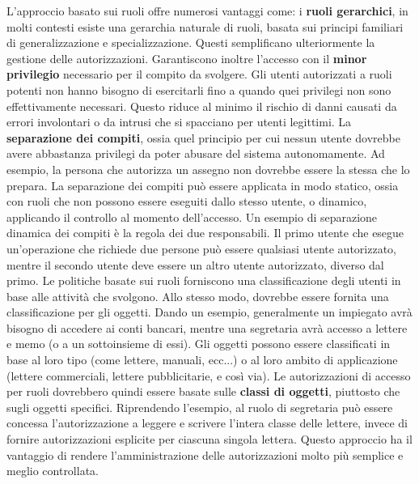                 L'approccio basato sui ruoli offre numerosi vantaggi come: i \textbf{ruoli gerarchici}, in molti contesti esiste una gerarchia naturale di ruoli, basata sui principi familiari di generalizzazione e specializzazione. Questi semplificano ulteriormente la gestione delle autorizzazioni. Garantiscono inoltre l'accesso con il \textbf{minor privilegio} necessario per il compito da svolgere. Gli utenti autorizzati a ruoli potenti non hanno bisogno di esercitarli fino a quando quei privilegi non sono effettivamente necessari. Questo riduce al minimo il rischio di danni causati da errori involontari o da intrusi che si spacciano per utenti legittimi. La \textbf{separazione dei compiti}, ossia quel principio per cui nessun utente dovrebbe avere abbastanza privilegi da poter abusare del sistema autonomamente. Ad esempio, la persona che autorizza un assegno non dovrebbe essere la stessa che lo prepara. La separazione dei compiti può essere applicata in modo statico, ossia con ruoli che non possono essere eseguiti dallo stesso utente, o dinamico, applicando il controllo al momento dell'accesso. Un esempio di separazione dinamica dei compiti è la regola dei due responsabili. Il primo utente che esegue un'operazione che richiede due persone può essere qualsiasi utente autorizzato, mentre il secondo utente deve essere un altro utente autorizzato, diverso dal primo. Le politiche basate sui ruoli forniscono una classificazione degli utenti in base alle attività che svolgono. Allo stesso modo, dovrebbe essere fornita una classificazione per gli oggetti. Dando un esempio, generalmente un impiegato avrà bisogno di accedere ai conti bancari, mentre una segretaria avrà accesso a lettere e memo (o a un sottoinsieme di essi). Gli oggetti possono essere classificati in base al loro tipo (come lettere, manuali, ecc...) o al loro ambito di applicazione (lettere commerciali, lettere pubblicitarie, e così via). Le autorizzazioni di accesso per ruoli dovrebbero quindi essere basate sulle \textbf{classi di oggetti}, piuttosto che sugli oggetti specifici. Riprendendo l'esempio, al ruolo di segretaria può essere concessa l'autorizzazione a leggere e scrivere l'intera classe delle lettere, invece di fornire autorizzazioni esplicite per ciascuna singola lettera. Questo approccio ha il vantaggio di rendere l'amministrazione delle autorizzazioni molto più semplice e meglio controllata.
            
